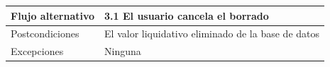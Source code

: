 \documentclass[12pt, a4paper]{book}
\begin{document}
\begin{table}[htbp]
\begin{tabular}{|l|l|}
		Flujo alternativo & 3.1 El usuario cancela el borrado                                                                                                                                                                                                                                                                                   \\ \hline
		Postcondiciones   & El valor liquidativo eliminado de la base de datos                                                                                                                                                                                                                                                                  \\ \hline
		Excepciones       & Ninguna                                                                                                                                                                                                                                                                                                             \\ \hline
	\end{tabular}
\end{table}
\end{document}
